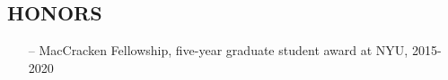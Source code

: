 \documentclass[margin]{res}
\begin{document}
\begin{resume}
\section{{\normalfont HONORS}}\begin{itemize}[leftmargin=*,noitemsep]
\item[--]{MacCracken Fellowship, five-year graduate student award at NYU, 2015-2020}
\end{itemize}


 
 

\end{resume}
\end{document}
